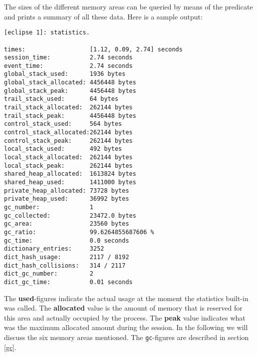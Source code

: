 The sizes of the different memory areas can be queried by means of the predicate
 and  prints a summary of all these data.
Here is a sample output:
\begin{verbatim}
[eclipse 1]: statistics.

times:                  [1.12, 0.09, 2.74] seconds
session_time:           2.74 seconds
event_time:             2.74 seconds
global_stack_used:      1936 bytes
global_stack_allocated: 4456448 bytes
global_stack_peak:      4456448 bytes
trail_stack_used:       64 bytes
trail_stack_allocated:  262144 bytes
trail_stack_peak:       4456448 bytes
control_stack_used:     564 bytes
control_stack_allocated:262144 bytes
control_stack_peak:     262144 bytes
local_stack_used:       492 bytes
local_stack_allocated:  262144 bytes
local_stack_peak:       262144 bytes
shared_heap_allocated:  1613824 bytes
shared_heap_used:       1411000 bytes
private_heap_allocated: 73728 bytes
private_heap_used:      36992 bytes
gc_number:              1 
gc_collected:           23472.0 bytes
gc_area:                23560 bytes
gc_ratio:               99.6264855687606 %
gc_time:                0.0 seconds
dictionary_entries:     3252 
dict_hash_usage:        2117 / 8192 
dict_hash_collisions:   314 / 2117 
dict_gc_number:         2 
dict_gc_time:           0.01 seconds
\end{verbatim}
The {\bf used}-figures indicate the actual usage at the moment the
statistics built-in was called. The {\bf allocated} value is the
amount of memory that is reserved for this area and actually occupied
by the {\eclipse} process. The {\bf peak} value indicates what was the
maximum allocated amount during the session.
In the following we will discuss the six memory areas mentioned.
The {\tt gc}-figures are described in section \ref{gc}.

